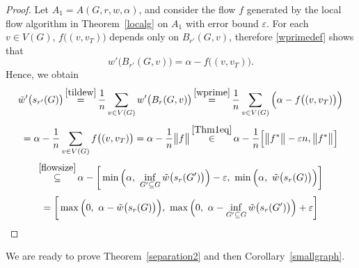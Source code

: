 \documentclass[12pt,a4paper]{article}
\newcommand{\eps}{\varepsilon}
\renewcommand{\:}{\colon}
\begin{document}
\begin{proof}
Let $A_1 = A(G, r, w, \alpha)$, and consider the flow $f$ generated by the local flow algorithm in Theorem~\ref{localg} on $A_1$ with error bound $\eps$. For each $v \in V(G)$, $f\big((v, v_T)\big)$ depends only on $B_{r'}(G, v)$, therefore \eqref{wprimedef} shows that
\begin{equation} \label{wprime}
w'\big(B_{r'}(G, v)\big) = \alpha - f\big((v, v_T)\big).
\end{equation}
Hence, we obtain
\begin{equation*}
\tilde{w}'\big(s_{r'}(G)\big)
\mathop{=}^{\eqref{tildew}} \frac{1}{n} \sum_{v \in V(G)} w'\big(B_r(G, v)\big)
\mathop{=}^{\eqref{wprime}} \frac{1}{n} \sum_{v \in V(G)} \Big(\alpha - f\big((v, v_T)\big)\Big)
\end{equation*}
\begin{equation*}
= \alpha - \frac{1}{n} \sum_{v \in V(G)} f\big((v, v_T)\big)
= \alpha - \frac{1}{n}\big\|f\big\|
\mathop{\in}^{\eqref{Thm1eq}} \alpha - \frac{1}{n}\Big[\big\|f^*\big\| - \eps n, \big\|f^*\big\|\Big] \end{equation*}
\begin{equation*}
\mathop{\subseteq}^{\eqref{flowsize}} \alpha - \bigg[ \min\Big(\alpha,\ \inf_{G' \subseteq G} \tilde{w}\big(s_r(G')\big)\Big) - \eps,\ \min\Big(\alpha,\ \tilde{w}\big(s_r(G)\big)\Big) \bigg]
\end{equation*}
\begin{equation*}
= \bigg[\max\Big(0,\ \alpha - \tilde{w}\big(s_r(G)\big)\Big),\ \max\Big(0,\ \alpha - \inf_{G' \subseteq G} \tilde{w}\big(s_r(G')\big)\Big) + \eps \bigg] \qedhere
\end{equation*}
\end{proof}

We are ready to prove Theorem~\ref{separation2} and then Corollary~\ref{smallgraph}. 
\end{document}
